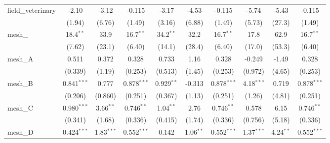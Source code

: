 \begin{tabular}{lccccccccc}
   field\_veterinary                                           & -2.10         & -3.12         & -0.115         & -3.17         & -4.53        & -0.115         & -5.74        & -5.43        & -0.115\\   
                                                               & (1.94)        & (6.76)        & (1.49)         & (3.16)        & (6.88)       & (1.49)         & (5.73)       & (27.3)       & (1.49)\\   
   mesh\_                                                      & 18.4$^{**}$   & 33.9          & 16.7$^{**}$    & 34.2$^{**}$   & 32.2         & 16.7$^{**}$    & 17.8         & 62.9         & 16.7$^{**}$\\   
                                                               & (7.62)        & (23.1)        & (6.40)         & (14.1)        & (28.4)       & (6.40)         & (17.0)       & (53.3)       & (6.40)\\   
   mesh\_A                                                     & 0.511         & 0.372         & 0.328          & 0.733         & 1.16         & 0.328          & -0.249       & -1.49        & 0.328\\   
                                                               & (0.339)       & (1.19)        & (0.253)        & (0.513)       & (1.45)       & (0.253)        & (0.972)      & (4.65)       & (0.253)\\   
   mesh\_B                                                     & 0.841$^{***}$ & 0.777         & 0.878$^{***}$  & 0.929$^{**}$  & -0.313       & 0.878$^{***}$  & 4.18$^{***}$ & 0.719        & 0.878$^{***}$\\   
                                                               & (0.206)       & (0.860)       & (0.251)        & (0.367)       & (1.13)       & (0.251)        & (1.26)       & (4.81)       & (0.251)\\   
   mesh\_C                                                     & 0.980$^{***}$ & 3.66$^{**}$   & 0.746$^{**}$   & 1.04$^{**}$   & 2.76         & 0.746$^{**}$   & 0.578        & 6.15         & 0.746$^{**}$\\   
                                                               & (0.341)       & (1.68)        & (0.336)        & (0.415)       & (1.74)       & (0.336)        & (0.756)      & (5.18)       & (0.336)\\   
   mesh\_D                                                     & 0.424$^{***}$ & 1.83$^{***}$  & 0.552$^{***}$  & 0.142         & 1.06$^{**}$  & 0.552$^{***}$  & 1.37$^{***}$ & 4.24$^{**}$  & 0.552$^{***}$\\   

\end{tabular}

